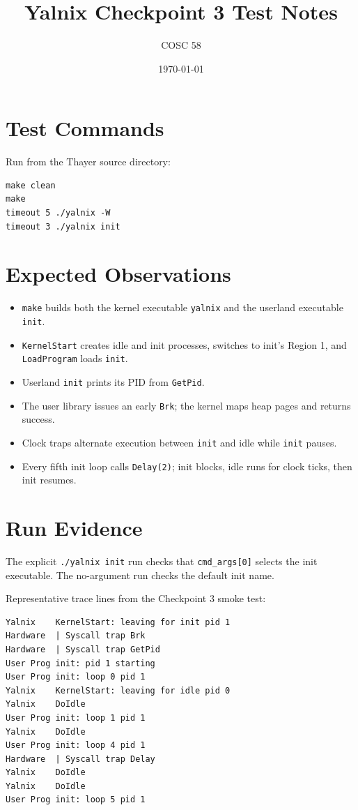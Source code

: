 \documentclass[11pt]{article}
\title{Yalnix Checkpoint 3 Test Notes}
\author{COSC 58}
\date{\today}
\begin{document}
\maketitle

\section{Test Commands}

Run from the Thayer source directory:

\begin{lstlisting}[style=shell]
make clean
make
timeout 5 ./yalnix -W
timeout 3 ./yalnix init
\end{lstlisting}

\section{Expected Observations}

\begin{itemize}[noitemsep]
  \item \texttt{make} builds both the kernel executable \texttt{yalnix} and the userland executable \texttt{init}.
  \item \texttt{KernelStart} creates idle and init processes, switches to init's Region 1, and \texttt{LoadProgram} loads \texttt{init}.
  \item Userland \texttt{init} prints its PID from \texttt{GetPid}.
  \item The user library issues an early \texttt{Brk}; the kernel maps heap pages and returns success.
  \item Clock traps alternate execution between \texttt{init} and idle while \texttt{init} pauses.
  \item Every fifth init loop calls \texttt{Delay(2)}; init blocks, idle runs for clock ticks, then init resumes.
\end{itemize}

\section{Run Evidence}

The explicit \texttt{./yalnix init} run checks that \texttt{cmd\_args[0]} selects the init executable. The no-argument run checks the default init name.

Representative trace lines from the Checkpoint 3 smoke test:

\begin{lstlisting}[style=shell]
Yalnix    KernelStart: leaving for init pid 1
Hardware  | Syscall trap Brk
Hardware  | Syscall trap GetPid
User Prog init: pid 1 starting
User Prog init: loop 0 pid 1
Yalnix    KernelStart: leaving for idle pid 0
Yalnix    DoIdle
User Prog init: loop 1 pid 1
Yalnix    DoIdle
User Prog init: loop 4 pid 1
Hardware  | Syscall trap Delay
Yalnix    DoIdle
Yalnix    DoIdle
User Prog init: loop 5 pid 1
\end{lstlisting}
\end{document}
